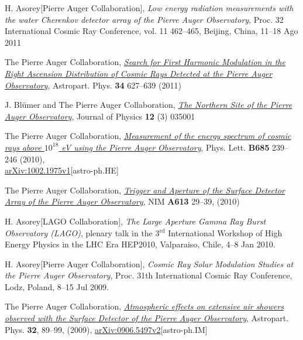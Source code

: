 \begin{etaremune}
\item {}H. Asorey[Pierre Auger Collaboration], {\emph{Low energy radiation
measurements with the water Cherenkov detector array of the Pierre Auger
Observatory}}, \en Proc. 32 International Cosmic Ray Conference, vol. 11
462--465, Beijing, China, 11--18 Ago 2011

\item {}The Pierre Auger Collaboration,
\href{http://dx.doi.org/10.1016/j.astropartphys.2010.12.007}{\emph{Search for
First Harmonic Modulation in the Right Ascension Distribution of Cosmic Rays
Detected at the Pierre Auger Observatory}}, Astropart. Phys. {\bf 34} 627--639
(2011)

\item {}J. Bl\"umer and The Pierre Auger Collaboration,
\href{http://dx.doi.org/10.1088/1367-2630/12/3/035001}{\emph{The Northern Site
of the Pierre Auger Observatory}}, Journal of Physics {\bf 12} (3) 035001

\item {}The Pierre Auger Collaboration,
\href{http://dx.doi.org/10.1016/j.physletb.2010.02.013}{\emph{Measurement of
the energy spectrum of cosmic rays above $10^{18}$ eV using the Pierre Auger
Observatory}}, Phys. Lett. {\bf B685} 239--246 (2010),\\
\href{http://arxiv.org/abs/1002.1975}{arXiv:1002.1975v1}[astro-ph.HE]

\item {}The Pierre Auger Collaboration,
\href{http://dx.doi.org/10.1016/j.nima.2009.11.018}{\emph{Trigger and Aperture
of the Surface Detector Array of the Pierre Auger Observatory}}, NIM {\bf A613}
29--39, (2010)

\item {}H. Asorey[LAGO Collaboration], {\emph{The Large Aperture Gamma Ray
Burst Observatory (LAGO)}}, plenary talk in the 3$^{\mathrm{rd}}$ International Workshop of
High Energy Physics in the LHC Era HEP2010, Valparaiso, Chile, 4--8 Jan 2010.

\item {}H. Asorey[Pierre Auger Collaboration], {\emph{Cosmic Ray Solar
Modulation Studies at the Pierre Auger Observatory}}, \en Proc. 31th
International Cosmic Ray Conference, Lodz, Poland, 8--15 Jul 2009.

\item {} The Pierre Auger Collaboration,
\href{http://dx.doi.org/10.1016/j.astropartphys.2009.06.004}{\emph{Atmospheric
effects on extensive air showers observed with the Surface Detector of the
Pierre Auger Observatory}}, Astropart. Phys. {\bf 32}, 89--99, (2009),
\href{http://arxiv.org/abs/0906.5497/}{arXiv:0906.5497v2}[astro-ph.IM]


\end{etaremune}
